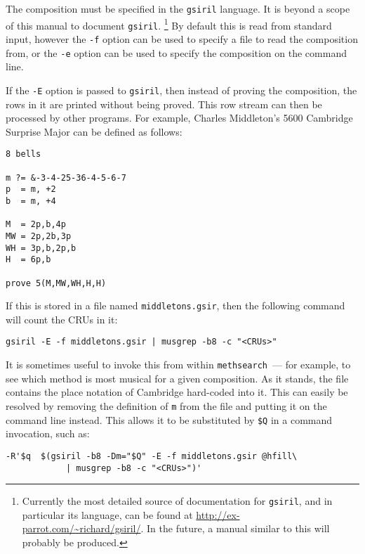 \documentclass[a4paper,11pt,oneside]{book}
\makeatletter
\newcommand{\fspec}[1]{\index{#1@{\hspace*{-\fspecwidth}\texttt{\$#1}}}}
\def\methsearch{\texttt{meth\-search}}
\makeatother
\begin{document}
The composition must be specified in the \texttt{gsiril} language.
It is beyond a scope of this manual to document \texttt{gsiril}.%
\footnote{Currently the most detailed source of documentation for 
\texttt{gsiril}, and in particular its language, can be found at 
\url{http://ex-parrot.com/~richard/gsiril/}.  In the future, a manual
similar to this will probably be produced.}
By default this is read from standard input, however the \verb+-f+ option
can be used to specify a file to read the composition from, or the \verb+-e+ 
option can be used to specify the composition on the command line.

If the \verb+-E+ option is passed to \texttt{gsiril}, then instead of 
proving the composition, the rows in it are printed without being proved.
This row stream can then be processed by other programs.  For example,
Charles Middleton's 
5600 Cambridge Surprise Major can be defined as 
follows:
\begin{Verbatim}
8 bells

m ?= &-3-4-25-36-4-5-6-7
p  = m, +2
b  = m, +4

M  = 2p,b,4p
MW = 2p,2b,3p
WH = 3p,b,2p,b
H  = 6p,b

prove 5(M,MW,WH,H,H)
\end{Verbatim}
If this is stored in a file named \texttt{middletons.gsir}, then the 
following command will count the CRUs in it:
\begin{Verbatim}
gsiril -E -f middletons.gsir | musgrep -b8 -c "<CRUs>"
\end{Verbatim}

It is sometimes useful to invoke this from within \methsearch\ --- for 
example, to see which method is most musical for a given composition.  As
it stands, the file contains the place notation of
Cambridge hard-coded into it.  This can easily be resolved by removing
the definition of \verb+m+ from the file and putting it on the command line
instead.  This allows it to be substituted by \verb+$Q+\fspec{Q} in a
command invocation, such as:
\begin{Verbatim}[commandchars=@~~]
-R'$q  $(gsiril -b8 -Dm="$Q" -E -f middletons.gsir @hfill\
            | musgrep -b8 -c "<CRUs>")'
\end{Verbatim}
\end{document}
